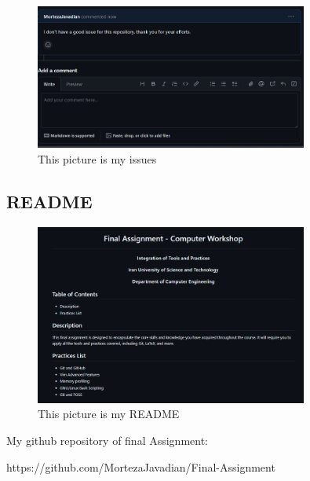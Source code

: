 \documentclass[titlepage]{article}
\begin{document}
	\begin{figure}[h]
		\centering
		\includegraphics[width=0.8\textwidth]{Screenshot.png}
		\caption{This picture is my issues}
	\end{figure}

	\subsection{README}
	
	\begin{figure}[h]
		\centering
		\includegraphics[width=0.8\textwidth]{Screenshot2.png}
		\caption{This picture is my README}
	\end{figure}

	My github repository of final Assignment:
	
	https://github.com/MortezaJavadian/Final-Assignment
	
\end{document}

